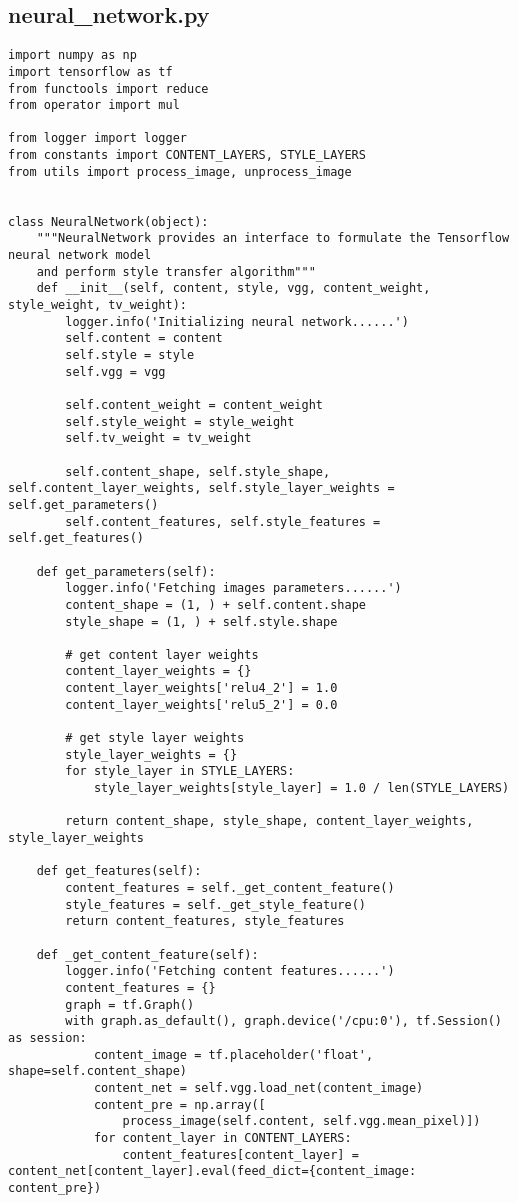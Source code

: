 \newpage
\begin{spacing}{1.2}
\section{neural\_network.py}
\label{sec:code:nn}
\begin{lstlisting}
import numpy as np
import tensorflow as tf
from functools import reduce
from operator import mul

from logger import logger
from constants import CONTENT_LAYERS, STYLE_LAYERS
from utils import process_image, unprocess_image


class NeuralNetwork(object):
    """NeuralNetwork provides an interface to formulate the Tensorflow neural network model
    and perform style transfer algorithm"""
    def __init__(self, content, style, vgg, content_weight, style_weight, tv_weight):
        logger.info('Initializing neural network......')
        self.content = content
        self.style = style
        self.vgg = vgg

        self.content_weight = content_weight
        self.style_weight = style_weight
        self.tv_weight = tv_weight

        self.content_shape, self.style_shape, self.content_layer_weights, self.style_layer_weights = self.get_parameters()
        self.content_features, self.style_features = self.get_features()

    def get_parameters(self):
        logger.info('Fetching images parameters......')
        content_shape = (1, ) + self.content.shape
        style_shape = (1, ) + self.style.shape

        # get content layer weights
        content_layer_weights = {}
        content_layer_weights['relu4_2'] = 1.0
        content_layer_weights['relu5_2'] = 0.0

        # get style layer weights
        style_layer_weights = {}
        for style_layer in STYLE_LAYERS:
            style_layer_weights[style_layer] = 1.0 / len(STYLE_LAYERS)

        return content_shape, style_shape, content_layer_weights, style_layer_weights

    def get_features(self):
        content_features = self._get_content_feature()
        style_features = self._get_style_feature()
        return content_features, style_features

    def _get_content_feature(self):
        logger.info('Fetching content features......')
        content_features = {}
        graph = tf.Graph()
        with graph.as_default(), graph.device('/cpu:0'), tf.Session() as session:
            content_image = tf.placeholder('float', shape=self.content_shape)
            content_net = self.vgg.load_net(content_image)
            content_pre = np.array([
                process_image(self.content, self.vgg.mean_pixel)])
            for content_layer in CONTENT_LAYERS:
                content_features[content_layer] = content_net[content_layer].eval(feed_dict={content_image: content_pre})


\end{lstlisting}
\end{spacing}
